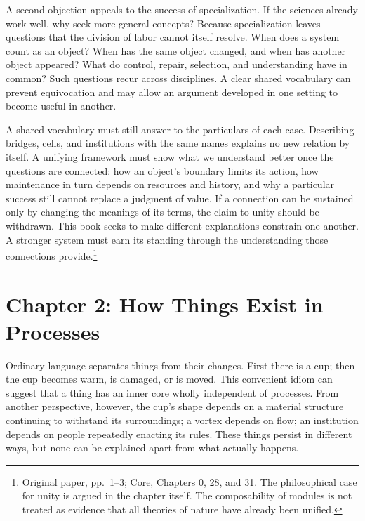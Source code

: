 \documentclass[
  english,
  11pt,
  oneside]{book}
\newcounter{none} %
\begin{document}
A second objection appeals to the success of specialization. If the sciences already work well, why seek more general concepts? Because specialization leaves questions that the division of labor cannot itself resolve. When does a system count as an object? When has the same object changed, and when has another object appeared? What do control, repair, selection, and understanding have in common? Such questions recur across disciplines. A clear shared vocabulary can prevent equivocation and may allow an argument developed in one setting to become useful in another.

\begingroup{}

A shared vocabulary must still answer to the particulars of each case. Describing bridges, cells, and institutions with the same names explains no new relation by itself. A unifying framework must show what we understand better once the questions are connected: how an object's boundary limits its action, how maintenance in turn depends on resources and history, and why a particular success still cannot replace a judgment of value. If a connection can be sustained only by changing the meanings of its terms, the claim to unity should be withdrawn. This book seeks to make different explanations constrain one another. A stronger system must earn its standing through the understanding those connections provide.\footnote{\hypertarget{ph-note-4}{}Original paper, pp.~1--3; Core, Chapters 0, 28, and 31. The philosophical case for unity is argued in the chapter itself. The composability of modules is not treated as evidence that all theories of nature have already been unified.}

\par\endgroup

\chapter{Chapter 2: How Things Exist in Processes}\label{ph-ch-02}

Ordinary language separates things from their changes. First there is a cup; then the cup becomes warm, is damaged, or is moved. This convenient idiom can suggest that a thing has an inner core wholly independent of processes. From another perspective, however, the cup's shape depends on a material structure continuing to withstand its surroundings; a vortex depends on flow; an institution depends on people repeatedly enacting its rules. These things persist in different ways, but none can be explained apart from what actually happens.
\end{document}
